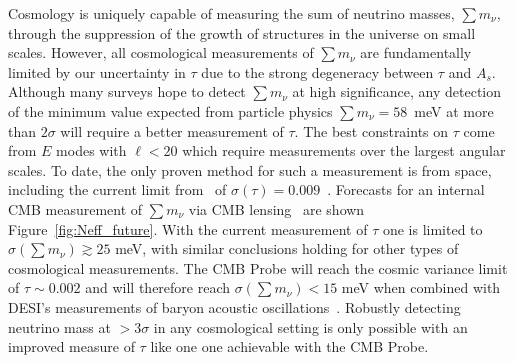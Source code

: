 Cosmology is uniquely capable of measuring the sum of neutrino masses, $\sum m_\nu$, through the 
suppression of the growth of structures in the universe on small scales.   However, all cosmological 
measurements of $\sum m_\nu$ are fundamentally limited by our uncertainty in $\tau$ due to the strong degeneracy 
between $\tau$ and $A_s$.  Although many surveys hope to detect $\sum m_\nu$ at high significance, any detection 
of the minimum value expected from particle physics  
$\sum m_\nu = 58$~meV at more than $2 \sigma$ will require a better measurement of $\tau$.  The best constraints on $\tau$ come from $E$ modes with $\ell < 20$ which require 
measurements over the largest angular scales.
To date, the only proven method for such a measurement is from space, including the current limit  from \planck\ of $\sigma({\tau}) = 0.009$~\cite{planck2016_xlvi}.  Forecasts for an internal 
CMB measurement of $\sum m_\nu$ via CMB lensing~\cite{Kaplinghat:2003bh} are shown Figure~\ref{fig:Neff_future}.  With the current measurement of $\tau$ one is limited to  
$\sigma(\sum m_\nu) \gtrsim 25$ meV, with similar conclusions holding for other types of cosmological measurements.  The \ac{CMB} Probe will reach the cosmic variance limit of $\tau \sim 0.002$ and will therefore 
reach $\sigma(\sum m_\nu) < 15$ meV when combined with DESI's measurements of 
baryon acoustic oscillations~\cite{Levi:2013gra}.  Robustly detecting neutrino mass at  $> 3\sigma$ in any cosmological setting is only possible with an improved measure of $\tau$ like one one achievable with the \ac{CMB} Probe.



